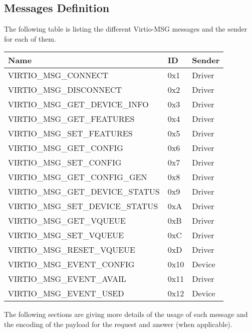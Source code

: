 \subsection{Messages Definition}\label{sec:Virtio Transport Options / Virtio Over Messages / Messages Definition}

The following table is listing the different Virtio-MSG messages and the sender
for each of them.

\begin{tabular}{|l|l|l|}
\hline
Name & ID & Sender \\
\hline
\hline
VIRTIO_MSG_CONNECT             & 0x1  & Driver \\
\hline
VIRTIO_MSG_DISCONNECT          & 0x2  & Driver \\
\hline
VIRTIO_MSG_GET_DEVICE_INFO   & 0x3  & Driver \\
\hline
VIRTIO_MSG_GET_FEATURES       & 0x4  & Driver \\
\hline
VIRTIO_MSG_SET_FEATURES       & 0x5  & Driver \\
\hline
VIRTIO_MSG_GET_CONFIG         & 0x6  & Driver \\
\hline
VIRTIO_MSG_SET_CONFIG         & 0x7  & Driver \\
\hline
VIRTIO_MSG_GET_CONFIG_GEN    & 0x8  & Driver \\
\hline
VIRTIO_MSG_GET_DEVICE_STATUS & 0x9  & Driver \\
\hline
VIRTIO_MSG_SET_DEVICE_STATUS & 0xA  & Driver \\
\hline
VIRTIO_MSG_GET_VQUEUE         & 0xB  & Driver \\
\hline
VIRTIO_MSG_SET_VQUEUE         & 0xC  & Driver \\
\hline
VIRTIO_MSG_RESET_VQUEUE       & 0xD  & Driver \\
\hline
VIRTIO_MSG_EVENT_CONFIG       & 0x10 & Device \\
\hline
VIRTIO_MSG_EVENT_AVAIL        & 0x11 & Driver \\
\hline
VIRTIO_MSG_EVENT_USED         & 0x12 & Device \\
\hline
\end{tabular}

The following sections are giving more details of the usage of each message
and the encoding of the payload for the request and answer (when applicable).

\newcommand{\msgdef}[1]{\subsubsection{VIRTIO_MSG_#1}\label{sec:Virtio Transport Options / Virtio Over Messages / Messages Definition / VIRTIO_MSG_#1}}

